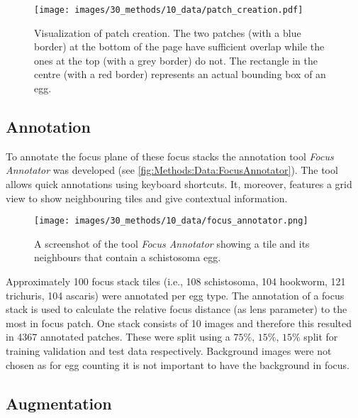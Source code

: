 \begin{figure}
    \centering
    \texttt{[image: images/30\_methods/10\_data/patch\_creation.pdf]}
    \caption{Visualization of patch creation. The two patches (with a blue border) at the bottom of the page have sufficient overlap while the ones at the top (with a grey border) do not. The rectangle in the centre (with a red border) represents an actual bounding box of an egg.}
    \label{fig:Methods:Data:PatchCreation}
\end{figure}



\subsection{Annotation}
\label{sec:Methods:Data:Annotation}

To annotate the focus plane of these focus stacks the annotation tool \emph{Focus Annotator} \cite{kuchelmeister2022focus} was developed (see \autoref{fig:Methods:Data:FocusAnnotator}). The tool allows quick annotations using keyboard shortcuts. It, moreover, features a grid view to show neighbouring tiles and give contextual information.

\begin{figure}
    \centering
    \texttt{[image: images/30\_methods/10\_data/focus\_annotator.png]}
    \caption{A screenshot of the tool \emph{Focus Annotator} showing a tile and its neighbours that contain a schistosoma egg.}
    \label{fig:Methods:Data:FocusAnnotator}
\end{figure}


Approximately 100 focus stack tiles (i.e., 108 schistosoma, 104 hookworm, 121 trichuris, 104 ascaris) were annotated per egg type. The annotation of a focus stack is used to calculate the relative focus distance (as lens parameter) to the most in focus patch. One stack consists of 10 images and therefore this resulted in 4367 annotated patches. These were split using a $75\%$, $15\%$, $15\%$ split for training validation and test data respectively. Background images were not chosen as for egg counting it is not important to have the background in focus.

\subsection{Augmentation}
\label{sec:Methods:Data:Augmentation}


